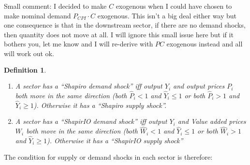 \documentclass[12pt,english]{article}
\newtheorem{definition}{Definition}
\begin{document}
Small comment: I decided to make $C$ exogenous when I could have chosen to make nominal demand $P_{CPI}\cdot C$ exogenous. This isn't a big deal either way but one consequence is that in the downstream sector, if there are no demand shocks, then quantity does not move at all. I will ignore this small issue here but if it bothers you, let me know and I will re-derive with $PC$ exogenous instead and all will work out ok.

\begin{definition}
\begin{enumerate}
	\item A sector has a ``Shapiro demand shock'' iff output $Y_i$ and output prices $P_i$ both move in the same direction (both $\hat{P}_i< 1$ and $\hat{Y}_i\leq 1$ or both $\hat{P}_i>1$ and $\hat{Y}_i\geq 1$). Otherwise it has a ``Shapiro supply shock''.
	\item A sector has a ``ShapirIO demand shock'' iff output $Y_i$ and Value added prices $W_i$ both move in the same direction (both $\hat{W}_i< 1$ and $\hat{Y}_i\leq 1$ or both $\hat{W}_i>1$ and $\hat{Y}_i\geq 1$). Otherwise it has a ``ShapirIO supply shock''
\end{enumerate}
\end{definition}

The condition for supply or demand shocks in each sector is therefore:
\end{document}
